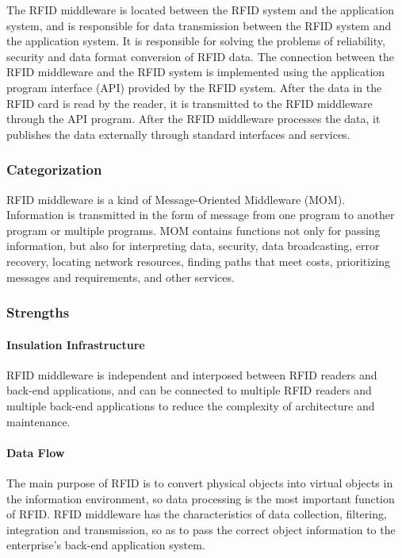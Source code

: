 \documentclass[conference]{IEEEtran}
\begin{document}
The RFID middleware is located between the RFID system and the application system, and is responsible for data transmission between the RFID system and the application system.
It is responsible for solving the problems of reliability, security and data format conversion of RFID data.
The connection between the RFID middleware and the RFID system is implemented using the application program interface (API) provided by the RFID system. After the data in the RFID card is read by the reader, it is transmitted to the RFID middleware through the API program. After the RFID middleware processes the data, it publishes the data externally through standard interfaces and services.

\subsubsection{Categorization}

RFID middleware is a kind of Message-Oriented Middleware (MOM). Information is transmitted in the form of message from one program to another program or multiple programs. MOM contains functions not only for passing information, but also for interpreting data, security, data broadcasting, error recovery, locating network resources, finding paths that meet costs, prioritizing messages and requirements, and other services.

\subsubsection{Strengths}

\paragraph{Insulation Infrastructure}
RFID middleware is independent and interposed between RFID readers and back-end applications, and can be connected to multiple RFID readers and multiple back-end applications to reduce the complexity of architecture and maintenance.

\paragraph{Data Flow}
The main purpose of RFID is to convert physical objects into virtual objects in the information environment, so data processing is the most important function of RFID. RFID middleware has the characteristics of data collection, filtering, integration and transmission, so as to pass the correct object information to the enterprise's back-end application system.
\end{document}
